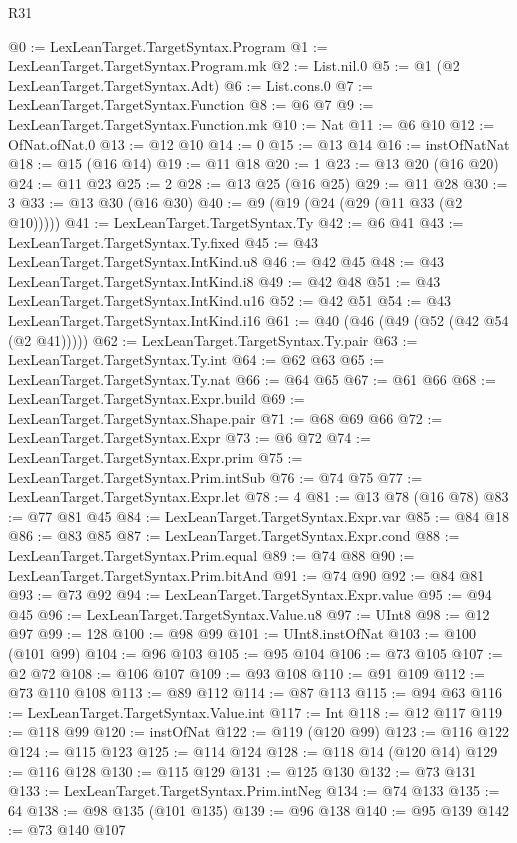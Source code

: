 \begin{lexlean}{R31}
\begin{coremodule}
@0 := LexLeanTarget.TargetSyntax.Program
@1 := LexLeanTarget.TargetSyntax.Program.mk
@2 := List.nil.{0}
@5 := @1 (@2 LexLeanTarget.TargetSyntax.Adt)
@6 := List.cons.{0}
@7 := LexLeanTarget.TargetSyntax.Function
@8 := @6 @7
@9 := LexLeanTarget.TargetSyntax.Function.mk
@10 := Nat
@11 := @6 @10
@12 := OfNat.ofNat.{0}
@13 := @12 @10
@14 := 0
@15 := @13 @14
@16 := instOfNatNat
@18 := @15 (@16 @14)
@19 := @11 @18
@20 := 1
@23 := @13 @20 (@16 @20)
@24 := @11 @23
@25 := 2
@28 := @13 @25 (@16 @25)
@29 := @11 @28
@30 := 3
@33 := @13 @30 (@16 @30)
@40 := @9 (@19 (@24 (@29 (@11 @33 (@2 @10)))))
@41 := LexLeanTarget.TargetSyntax.Ty
@42 := @6 @41
@43 := LexLeanTarget.TargetSyntax.Ty.fixed
@45 := @43 LexLeanTarget.TargetSyntax.IntKind.u8
@46 := @42 @45
@48 := @43 LexLeanTarget.TargetSyntax.IntKind.i8
@49 := @42 @48
@51 := @43 LexLeanTarget.TargetSyntax.IntKind.u16
@52 := @42 @51
@54 := @43 LexLeanTarget.TargetSyntax.IntKind.i16
@61 := @40 (@46 (@49 (@52 (@42 @54 (@2 @41)))))
@62 := LexLeanTarget.TargetSyntax.Ty.pair
@63 := LexLeanTarget.TargetSyntax.Ty.int
@64 := @62 @63
@65 := LexLeanTarget.TargetSyntax.Ty.nat
@66 := @64 @65
@67 := @61 @66
@68 := LexLeanTarget.TargetSyntax.Expr.build
@69 := LexLeanTarget.TargetSyntax.Shape.pair
@71 := @68 @69 @66
@72 := LexLeanTarget.TargetSyntax.Expr
@73 := @6 @72
@74 := LexLeanTarget.TargetSyntax.Expr.prim
@75 := LexLeanTarget.TargetSyntax.Prim.intSub
@76 := @74 @75
@77 := LexLeanTarget.TargetSyntax.Expr.let
@78 := 4
@81 := @13 @78 (@16 @78)
@83 := @77 @81 @45
@84 := LexLeanTarget.TargetSyntax.Expr.var
@85 := @84 @18
@86 := @83 @85
@87 := LexLeanTarget.TargetSyntax.Expr.cond
@88 := LexLeanTarget.TargetSyntax.Prim.equal
@89 := @74 @88
@90 := LexLeanTarget.TargetSyntax.Prim.bitAnd
@91 := @74 @90
@92 := @84 @81
@93 := @73 @92
@94 := LexLeanTarget.TargetSyntax.Expr.value
@95 := @94 @45
@96 := LexLeanTarget.TargetSyntax.Value.u8
@97 := UInt8
@98 := @12 @97
@99 := 128
@100 := @98 @99
@101 := UInt8.instOfNat
@103 := @100 (@101 @99)
@104 := @96 @103
@105 := @95 @104
@106 := @73 @105
@107 := @2 @72
@108 := @106 @107
@109 := @93 @108
@110 := @91 @109
@112 := @73 @110 @108
@113 := @89 @112
@114 := @87 @113
@115 := @94 @63
@116 := LexLeanTarget.TargetSyntax.Value.int
@117 := Int
@118 := @12 @117
@119 := @118 @99
@120 := instOfNat
@122 := @119 (@120 @99)
@123 := @116 @122
@124 := @115 @123
@125 := @114 @124
@128 := @118 @14 (@120 @14)
@129 := @116 @128
@130 := @115 @129
@131 := @125 @130
@132 := @73 @131
@133 := LexLeanTarget.TargetSyntax.Prim.intNeg
@134 := @74 @133
@135 := 64
@138 := @98 @135 (@101 @135)
@139 := @96 @138
@140 := @95 @139
@142 := @73 @140 @107

\end{coremodule}
\end{lexlean}
